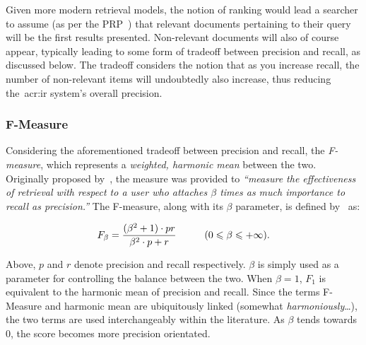 Given more modern retrieval models, the notion of ranking would lead a searcher to assume (as per the PRP~\citep{robertson1977prp}) that relevant documents pertaining to their query will be the first results presented. Non-relevant documents will also of course appear, typically leading to some form of tradeoff between precision and recall, as discussed below. The tradeoff considers the notion that as you increase recall, the number of non-relevant items will undoubtedly also increase, thus reducing the~\gls{acr:ir} system's overall precision.

\subsubsection{F-Measure}
Considering the aforementioned tradeoff between precision and recall, the \emph{F-measure}, which represents a \emph{weighted, harmonic mean} between the two. Originally proposed by~\cite{rijsbergen1979ir}, the measure was provided to \emph{``measure the effectiveness of retrieval with respect to a user who attaches $\beta$ times as much importance to recall as precision.''} The F-measure, along with its $\beta$ parameter, is defined by~\cite{chinchor1992f_measure} as:

\begin{equation*}
F_\beta = \frac{(\beta^2 + 1)\cdot pr}{\beta^2 \cdot p + r}\hspace{10mm}(0\leqslant\beta\leqslant+\infty).
\end{equation*}

Above, $p$ and $r$ denote precision and recall respectively. $\beta$ is simply used as a parameter for controlling the balance between the two. When $\beta = 1$, $F_1$ is equivalent to the harmonic mean of precision and recall. Since the terms F-Measure and harmonic mean are ubiquitously linked (somewhat \emph{harmoniously}\dots), the two terms are used interchangeably within the literature. As $\beta$ tends towards $0$, the score becomes more precision orientated.

